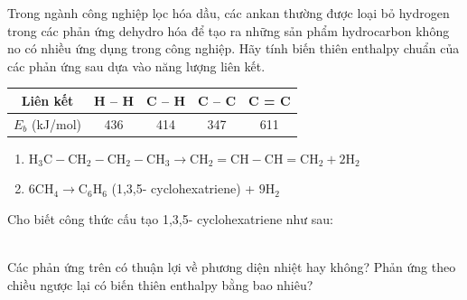 \documentclass[Main.tex]{subfiles}
\begin{document}
\begin{bt}
	Trong ngành công nghiệp lọc hóa dầu, các ankan thường được loại bỏ hydrogen trong các phản ứng dehydro hóa để tạo ra những sản phẩm hydrocarbon không no có nhiều ứng dụng trong công nghiệp. Hãy tính biến thiên enthalpy chuẩn của các phản ứng sau dựa vào năng lượng liên kết.
	\begin{table}[h]
		\centering
		\begin{tabular}{|c|c|c|c|c|}
			\hline
			Liên kết & H – H & C – H & C – C & C = C \\
			\hline
			$E_b$ (kJ/mol) & 436 & 414 & 347 & 611 \\
			\hline
		\end{tabular}
	\end{table}
	\begin{enumerate}
		\item $\mathrm{H_3C-CH_2-CH_2-CH_3 \longrightarrow CH_2=CH-CH=CH_2 + 2H_2}$
		\item $6\mathrm{CH_4 \longrightarrow C_6H_6}$ (1,3,5- cyclohexatriene) + $9\mathrm{H_2}$
	\end{enumerate}
	Cho biết công thức cấu tạo 1,3,5- cyclohexatriene như sau: 
	\begin{center}
	\end{center}
	\\
	Các phản ứng trên có thuận lợi về phương diện nhiệt hay không? Phản ứng theo chiều ngược lại có biến thiên enthalpy bằng bao nhiêu?
\end{bt}
\end{document}

